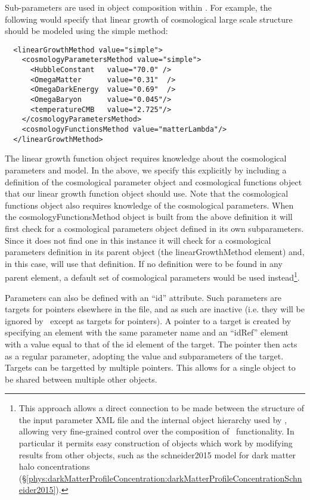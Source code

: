 Sub-parameters are used in object composition within \glc. For example, the following would specify that linear growth of cosmological large scale structure should be modeled using the {\normalfont \ttfamily simple} method:
\begin{verbatim}
  <linearGrowthMethod value="simple">
    <cosmologyParametersMethod value="simple">
      <HubbleConstant   value="70.0" />
      <OmegaMatter      value="0.31"  />
      <OmegaDarkEnergy  value="0.69"  />
      <OmegaBaryon      value="0.045"/>
      <temperatureCMB   value="2.725"/>
    </cosmologyParametersMethod>
    <cosmologyFunctionsMethod value="matterLambda"/>
  </linearGrowthMethod>
\end{verbatim}
The linear growth function object requires knowledge about the cosmological parameters and model. In the above, we specify this explicitly by including a definition of the cosmological parameter object and cosmological functions object that our linear growth function object should use. Note that the cosmological functions object also requires knowledge of the cosmological parameters. When the {\normalfont \ttfamily cosmologyFunctionsMethod} object is built from the above definition it will first check for a cosmological parameters object defined in its own subparameters. Since it does not find one in this instance it will check for a cosmological parameters definition in its parent object (the {\normalfont \ttfamily linearGrowthMethod} element) and, in this case, will use that definition. If no definition were to be found in any parent element, a default set of cosmological parameters would be used instead\footnote{This approach allows a direct connection to be made between the structure of the input parameter XML file and the internal object hierarchy used by \glc, allowing very fine-grained control over the composition of \glc\ functionality. In particular it permits easy construction of objects which work by modifying results from other objects, such as the {\normalfont \ttfamily schneider2015} model for dark matter halo concentrations (\S\ref{phys:darkMatterProfileConcentration:darkMatterProfileConcentrationSchneider2015}).}.

Parameters can also be defined with an ``{\normalfont \ttfamily id}'' attribute. Such parameters are targets for pointers elsewhere in the file, and as such are inactive (i.e. they will be ignored by \glc\ except as targets for pointers). A pointer to a target is created by specifying an element with the same parameter name and an ``{\normalfont \ttfamily idRef}'' element with a value equal to that of the {\normalfont \ttfamily id} element of the target. The pointer then acts as a regular parameter, adopting the value and subparameters of the target. Targets can be targetted by multiple pointers. This allows for a single object to be shared between multiple other objects.

